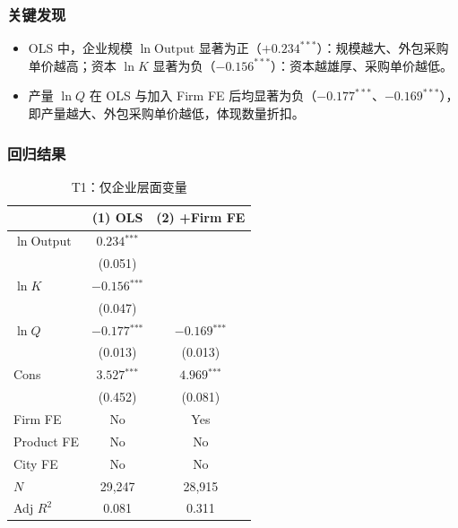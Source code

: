 \documentclass[12pt]{article}
\newcommand{\sym}[1]{\ensuremath{^{\text{#1}}}}
\newcommand{\se}[1]{{\small(#1)}}
\newcommand{\abs}{\textemdash}
\begin{document}
\subsubsection*{关键发现}

\begin{itemize}[nosep]
  \item OLS 中，企业规模 $\ln\mathrm{Output}$ 显著为正（$+0.234^{***}$）：规模越大、外包采购单价越高；资本 $\ln K$ 显著为负（$-0.156^{***}$）：资本越雄厚、采购单价越低。
  \item 产量 $\ln Q$ 在 OLS 与加入 Firm FE 后均显著为负（$-0.177^{***}$、$-0.169^{***}$），即产量越大、外包采购单价越低，体现数量折扣。
\end{itemize}

\subsubsection*{回归结果}

\begin{table}[H]
  \centering
  \caption{T1：仅企业层面变量}
  \begin{threeparttable}
    \begin{tabular}{lcc}
      \toprule
       & (1) OLS & (2) +Firm FE \\
      \midrule
      $\ln\mathrm{Output}$ & $0.234\sym{***}$ & \abs \\
                           & \se{0.051}       &     \\[4pt]
      $\ln K$              & $-0.156\sym{***}$ & \abs \\
                           & \se{0.047}        &     \\[4pt]
      $\ln Q$              & $-0.177\sym{***}$ & $-0.169\sym{***}$ \\
                           & \se{0.013}        & \se{0.013} \\[4pt]
      Cons               & $3.527\sym{***}$ & $4.969\sym{***}$ \\
                           & \se{0.452}       & \se{0.081}       \\
      \midrule
      Firm FE              & No  & Yes \\
      Product FE           & No  & No  \\
      City FE              & No  & No  \\
      $N$                  & 29,247 & 28,915 \\
      Adj $R^2$            & 0.081  & 0.311  \\
      \bottomrule
    \end{tabular}

  \end{threeparttable}
\end{table}
\end{document}
